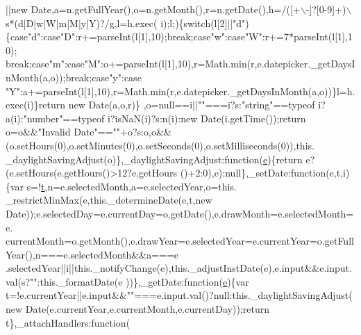 \begin{DoxyCode}
      ||\textcolor{keyword}{new} Date,a=n.getFullYear(),o=n.getMonth(),r=n.getDate(),h=/([+\(\backslash\)-]?[0-9]+)\(\backslash\)s*(d|D|w|W|m|M|y|Y)?/g,l=h.exec(
      i);l;)\{\textcolor{keywordflow}{switch}(l[2]||\textcolor{stringliteral}{"d"})\{\textcolor{keywordflow}{case}\textcolor{stringliteral}{"d"}:\textcolor{keywordflow}{case}\textcolor{stringliteral}{"D"}:r+=parseInt(l[1],10);\textcolor{keywordflow}{break};\textcolor{keywordflow}{case}\textcolor{stringliteral}{"w"}:\textcolor{keywordflow}{case}\textcolor{stringliteral}{"W"}:r+=7*parseInt(l[1],10);\textcolor{keywordflow}{
      break};\textcolor{keywordflow}{case}\textcolor{stringliteral}{"m"}:\textcolor{keywordflow}{case}\textcolor{stringliteral}{"M"}:o+=parseInt(l[1],10),r=Math.min(r,e.datepicker.\_getDaysInMonth(a,o));\textcolor{keywordflow}{break};\textcolor{keywordflow}{case}\textcolor{stringliteral}{"y"}:\textcolor{keywordflow}{case}\textcolor{stringliteral}{
      "Y"}:a+=parseInt(l[1],10),r=Math.min(r,e.datepicker.\_getDaysInMonth(a,o))\}l=h.exec(i)\}\textcolor{keywordflow}{return} \textcolor{keyword}{new} Date(a,o,r)\}
      ,o=null==i||\textcolor{stringliteral}{""}===i?s:\textcolor{stringliteral}{"string"}==typeof i?a(i):\textcolor{stringliteral}{"number"}==typeof i?isNaN(i)?s:n(i):new Date(i.getTime());\textcolor{keywordflow}{return}
       o=o&&\textcolor{stringliteral}{"Invalid Date"}==\textcolor{stringliteral}{""}+o?s:o,o&&(o.setHours(0),o.setMinutes(0),o.setSeconds(0),o.setMilliseconds(0)),this.
      \_daylightSavingAdjust(o)\},\_daylightSavingAdjust:\textcolor{keyword}{function}(\hyperlink{jquery-ui_8min_8js_a2c038346d47955cbe2cb91e338edd7e1}{e})\{\textcolor{keywordflow}{return} e?(e.setHours(e.getHours()>12?e.getHours
      ()+2:0),e):null\},\_setDate:function(e,t,i)\{var s=!\hyperlink{jquery-2_80_83_8min_8js_aaccc9105df5383111407fd5b41255e23}{t},n=e.selectedMonth,a=e.selectedYear,o=this.
      \_restrictMinMax(e,this.\_determineDate(e,t,\textcolor{keyword}{new} Date));e.selectedDay=e.currentDay=o.getDate(),e.drawMonth=e.selectedMonth=e.
      currentMonth=o.getMonth(),e.drawYear=e.selectedYear=e.currentYear=o.getFullYear(),n===e.selectedMonth&&a===e
      .selectedYear||i||this.\_notifyChange(e),this.\_adjustInstDate(e),e.input&&e.input.val(s?\textcolor{stringliteral}{""}:this.\_formatDate(e
      ))\},\_getDate:\textcolor{keyword}{function}(\hyperlink{jquery-ui_8min_8js_a2c038346d47955cbe2cb91e338edd7e1}{e})\{var t=!e.currentYear||e.input&&\textcolor{stringliteral}{""}===e.input.val()?null:this.\_daylightSavingAdjust(\textcolor{keyword}{
      new} Date(e.currentYear,e.currentMonth,e.currentDay));\textcolor{keywordflow}{return} t\},\_attachHandlers:\textcolor{keyword}{function}(

\end{DoxyCode}
